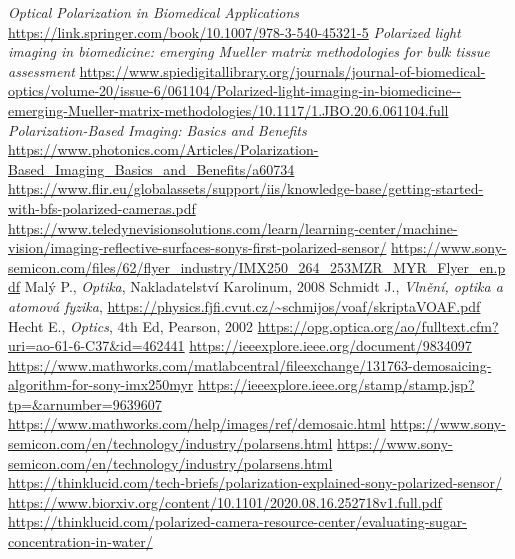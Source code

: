 \documentclass[a4paper]{article}
\numberwithin{equation}{section}
\begin{document}
    \newpage
    \begin{thebibliography}{99}
         \textit{Optical Polarization in Biomedical Applications} \url{https://link.springer.com/book/10.1007/978-3-540-45321-5}
         \textit{Polarized light imaging in biomedicine: emerging Mueller matrix methodologies for bulk tissue assessment} \url{https://www.spiedigitallibrary.org/journals/journal-of-biomedical-optics/volume-20/issue-6/061104/Polarized-light-imaging-in-biomedicine--emerging-Mueller-matrix-methodologies/10.1117/1.JBO.20.6.061104.full}
         \textit{Polarization-Based Imaging: Basics and Benefits} \url{https://www.photonics.com/Articles/Polarization-Based_Imaging_Basics_and_Benefits/a60734}
         \url{https://www.flir.eu/globalassets/support/iis/knowledge-base/getting-started-with-bfs-polarized-cameras.pdf}
         \url{https://www.teledynevisionsolutions.com/learn/learning-center/machine-vision/imaging-reflective-surfaces-sonys-first-polarized-sensor/}
         \url{https://www.sony-semicon.com/files/62/flyer_industry/IMX250_264_253MZR_MYR_Flyer_en.pdf}
         Malý P., \textit{Optika}, Nakladatelství Karolinum, 2008
         Schmidt J., \textit{Vlnění, optika a atomová fyzika}, \url{https://physics.fjfi.cvut.cz/~schmijos/voaf/skriptaVOAF.pdf}
         Hecht E., \textit{Optics}, 4th Ed, Pearson, 2002
         \url{https://opg.optica.org/ao/fulltext.cfm?uri=ao-61-6-C37&id=462441}
         \url{https://ieeexplore.ieee.org/document/9834097}
         \url{https://www.mathworks.com/matlabcentral/fileexchange/131763-demosaicing-algorithm-for-sony-imx250myr}
         \url{https://ieeexplore.ieee.org/stamp/stamp.jsp?tp=&arnumber=9639607}
         \url{https://www.mathworks.com/help/images/ref/demosaic.html}
         \url{https://www.sony-semicon.com/en/technology/industry/polarsens.html}
         \url{https://www.sony-semicon.com/en/technology/industry/polarsens.html}
         \url{https://thinklucid.com/tech-briefs/polarization-explained-sony-polarized-sensor/}
         \url{https://www.biorxiv.org/content/10.1101/2020.08.16.252718v1.full.pdf}
         \url{https://thinklucid.com/polarized-camera-resource-center/evaluating-sugar-concentration-in-water/}
    \end{thebibliography}
\end{document}
